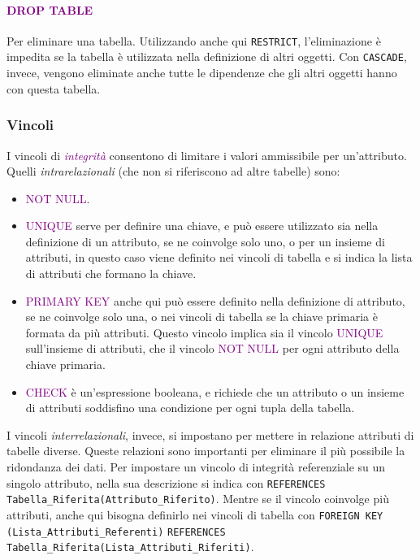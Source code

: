 \paragraph{\textcolor{purple}{DROP TABLE}} Per eliminare una tabella. Utilizzando anche qui \verb|RESTRICT|, l'eliminazione
è impedita se la tabella è utilizzata nella definizione di altri oggetti. Con \verb|CASCADE|, invece, vengono eliminate anche tutte
le dipendenze che gli altri oggetti hanno con questa tabella.

\subsubsection{Vincoli}

I vincoli di \emph{\textcolor{purple}{integrità}} consentono di limitare i valori ammissibile
per un'attributo. Quelli \emph{intrarelazionali} (che non si riferiscono ad altre tabelle) sono:
\begin{itemize}
    \item \textcolor{purple}{NOT NULL}.
    \item \textcolor{purple}{UNIQUE} serve per definire una chiave, e può essere utilizzato sia nella definizione
        di un attributo, se ne coinvolge solo uno, o per un insieme di attributi, in questo caso viene definito nei vincoli
        di tabella e si indica la lista di attributi che formano la chiave.
    \item \textcolor{purple}{PRIMARY KEY} anche qui può essere definito nella definizione di attributo, se ne coinvolge solo una, o nei vincoli di tabella
        se la chiave primaria è formata da più attributi. Questo vincolo implica sia il vincolo \textcolor{purple}{UNIQUE} sull'insieme di attributi,
        che il vincolo \textcolor{purple}{NOT NULL} per ogni attributo della chiave primaria.
    \item \textcolor{purple}{CHECK} è un'espressione booleana, e richiede che un attributo o un insieme di attributi soddisfino una condizione per ogni tupla della tabella.
\end{itemize}

I vincoli \emph{interrelazionali}, invece, si impostano per mettere in relazione attributi di
tabelle diverse. Queste relazioni sono importanti per eliminare il più possibile la ridondanza dei dati.
Per impostare un vincolo di integrità referenziale su un singolo attributo, nella sua descrizione si indica con \verb|REFERENCES Tabella_Riferita(Attributo_Riferito)|.
Mentre se il vincolo coinvolge più attributi, anche qui bisogna definirlo nei vincoli di tabella con \verb|FOREIGN KEY (Lista_Attributi_Referenti)|
\verb|REFERENCES Tabella_Riferita(Lista_Attributi_Riferiti)|.

